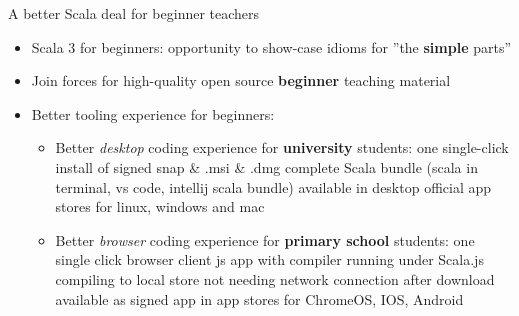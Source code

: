 \documentclass[aspectratio=169]{beamer}
\newcommand{\EndSlide}{\begin{frame}[plain]\endpage\end{frame}}
\newenvironment{Slide}[1]%
  {\begin{frame}[environment=Slide]{#1}}
  {\end{frame}}%
\begin{document}
\begin{Slide}{A better Scala deal for beginner teachers}
  \begin{itemize}
    \item Scala 3 for beginners: opportunity to show-case idioms for ''the \textbf{simple} parts''
    \item Join forces for high-quality open source \textbf{beginner} teaching material
    \item Better tooling experience for beginners: 
    \begin{itemize}
      \item Better \textit{desktop} coding experience for \textbf{university} students: one single-click install of signed snap \& .msi \& .dmg  complete Scala bundle (scala in terminal, vs code, intellij scala bundle) available in desktop official app stores for linux, windows and mac
      \item Better \textit{browser} coding experience for \textbf{primary school} students: one single click browser client js app with compiler running under Scala.js compiling to local store not needing network connection after download available as signed app in app stores for ChromeOS, IOS, Android
    \end{itemize}
  \end{itemize}

\end{Slide}

\EndSlide
\end{document}
